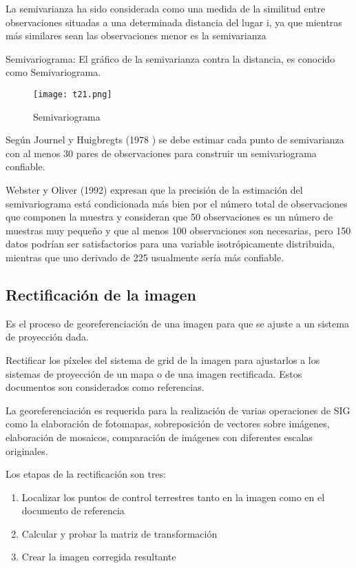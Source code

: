   La semivarianza ha sido considerada como una medida de la 
  similitud entre observaciones situadas a una determinada 
  distancia del lugar i, ya que mientras más similares sean las 
  observaciones menor es la semivarianza
  
  Semivariograma: El gráfico de la semivarianza contra la distancia, es conocido como 
  Semivariograma.
  
  \begin{figure}[h!]
  \centering
    \texttt{[image: t21.png]}
    \caption{Semivariograma}
    \label{t21}
  \end{figure}
  Según Journel y Huigbregts (1978 ) se debe estimar cada punto de 
  semivarianza con al menos 30 pares de observaciones para construir 
  un semivariograma confiable. 
  
  Webster y Oliver (1992) expresan que la precisión de la estimación del 
  semivariograma está condicionada más bien por el número total de 
  observaciones que componen la muestra y consideran que 50 
  observaciones es un número de muestras muy pequeño y que al menos 
  100 observaciones son necesarias, pero 150 datos podrían ser 
  satisfactorios para una variable isotrópicamente distribuida, mientras 
  que uno derivado de 225 usualmente sería más confiable.
  
  \subsection{Rectificación de la imagen}
  
  Es el proceso de georeferenciación de una imagen para que se ajuste a un sistema de proyección dada.
  
  Rectificar los píxeles del sistema de grid de la imagen para ajustarlos a los sistemas de proyección de un mapa o  de una imagen rectificada. Estos documentos son  considerados como referencias.
  
  La georeferenciación es requerida para la realización de varias operaciones de SIG como 
  la elaboración de fotomapas,  sobreposición de vectores 
  sobre imágenes, elaboración de mosaicos, 
  comparación de imágenes con diferentes escalas 
  originales.
  
  Los etapas de la rectificación son tres:
  \begin{enumerate}
      \item Localizar los puntos de control terrestres tanto en la imagen como en el documento de referencia
      \item Calcular y probar la matriz de transformación
      \item Crear la imagen corregida resultante
  \end{enumerate}
  

